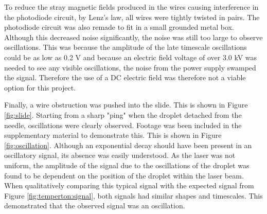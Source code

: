 \documentclass{physics_article_B}
\begin{document}
        \vspace*{-0.3cm}To reduce the stray magnetic fields produced in the wires causing interference in the photodiode circuit, by Lenz's law, all wires were tightly twisted in pairs. The photodiode circuit was also remade to fit in a small grounded metal box. Although this decreased noise significantly, the noise was still too large to observe oscillations. This was because the amplitude of the late timescale oscillations could be as low as 0.2 V and because an electric field voltage of over 3.0 kV was needed to see any visible oscillations, the noise from the power supply swamped the signal. Therefore the use of a DC electric field was therefore not a viable option for this project. 
        
        Finally, a wire obstruction was pushed into the slide. This is shown in Figure \ref{fig:slide}. Starting from a sharp "ping" when the droplet detached from the needle, oscillations were clearly observed. Footage was been included in the supplementary material to demonstrate this. This is shown in Figure \ref{fig:oscillation}. Although an exponential decay should have been present in an oscillatory signal, its absence was easily understood. As the laser was not uniform, the amplitude of the signal due to the oscillations of the droplet was found to be dependent on the position of the droplet within the laser beam. When qualitatively comparing this typical signal with the expected signal from Figure \ref{fig:temperton:signal}, both signals had similar shapes and timescales. This demonstrated that the observed signal was an oscillation. 
        
\end{document}
